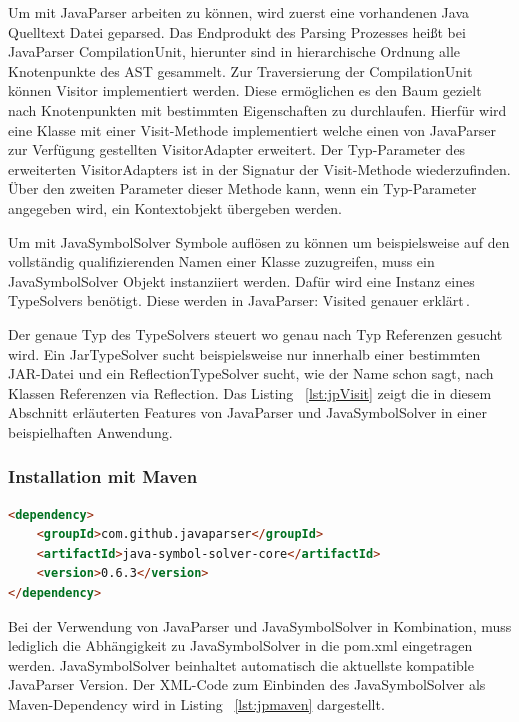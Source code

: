 \documentclass[12pt,oneside,a4paper,parskip]{scrbook}
\begin{document}
Um mit JavaParser arbeiten zu können, wird zuerst eine vorhandenen Java Quelltext Datei geparsed. Das Endprodukt des Parsing Prozesses heißt bei JavaParser CompilationUnit, hierunter sind in hierarchische Ordnung alle Knotenpunkte des AST gesammelt. Zur Traversierung der CompilationUnit können Visitor implementiert werden. Diese ermöglichen es den Baum gezielt nach Knotenpunkten mit bestimmten Eigenschaften zu durchlaufen. Hierfür wird eine Klasse mit einer Visit-Methode implementiert welche einen von JavaParser zur Verfügung gestellten VisitorAdapter erweitert. Der Typ-Parameter des erweiterten VisitorAdapters ist in der Signatur der Visit-Methode wiederzufinden. Über den zweiten Parameter dieser Methode kann, wenn ein Typ-Parameter angegeben wird, ein Kontextobjekt übergeben werden.

Um mit JavaSymbolSolver Symbole auflösen zu können um beispielsweise auf den vollständig qualifizierenden Namen einer Klasse zuzugreifen, muss ein JavaSymbolSolver Objekt instanziiert werden. Dafür wird eine Instanz eines TypeSolvers benötigt. Diese werden in JavaParser: Visited genauer erklärt\,\cite[S. 39ff.]{javaparser2017}. 

Der genaue Typ des TypeSolvers steuert wo genau nach Typ Referenzen gesucht wird. Ein JarTypeSolver sucht beispielsweise nur innerhalb einer bestimmten JAR-Datei und ein ReflectionTypeSolver sucht, wie der Name schon sagt, nach Klassen Referenzen via Reflection. Das Listing ~\ref{lst:jpVisit} zeigt die in diesem Abschnitt erläuterten Features von JavaParser und JavaSymbolSolver in einer beispielhaften Anwendung.

\subsubsection{Installation mit Maven}

\begin{lstlisting}[label=lst:jpmaven,
language=HTML,
firstnumber=1,
caption=XML-Code zum Einbinden von JavaParser und JavaSymbolSolver als Maven-Dependency.]
<dependency>
	<groupId>com.github.javaparser</groupId>
	<artifactId>java-symbol-solver-core</artifactId>
	<version>0.6.3</version>
</dependency>
\end{lstlisting}

Bei der Verwendung von JavaParser und JavaSymbolSolver in Kombination, muss lediglich die Abhängigkeit zu JavaSymbolSolver in die pom.xml eingetragen werden. JavaSymbolSolver beinhaltet automatisch die aktuellste kompatible JavaParser Version. Der XML-Code zum Einbinden des JavaSymbolSolver als Maven-Dependency wird in Listing ~\ref{lst:jpmaven} dargestellt.
\end{document}
